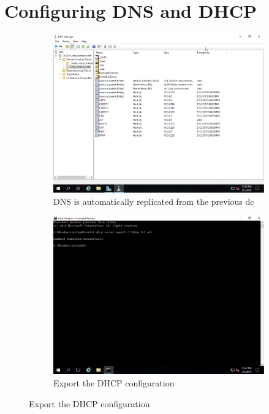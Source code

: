 \section{Configuring DNS and DHCP}
\begin{figure}[!htb]
	\begin{subfigure}{0.5\textwidth}
		\captionsetup{width=0.8\linewidth}
		\includegraphics[width=0.9\linewidth]{img/Methodologie/Migration24.png}
		\centering
		\caption{DNS is automatically replicated from the previous \acrshort{dc}}
	\end{subfigure}
	\begin{subfigure}{0.5\textwidth}
		\captionsetup{width=0.8\linewidth}
		\includegraphics[width=0.9\linewidth]{img/Methodologie/Migration25.png} 
		\centering
		\caption{Export the DHCP configuration}
	\end{subfigure}
\end{figure}
